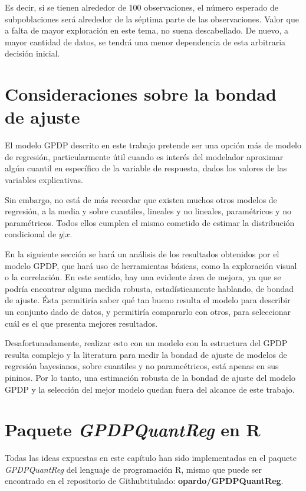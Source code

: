 Es decir, si se tienen alrededor de 100 observaciones, el n\'umero esperado de subpoblaciones ser\'a alrededor de la s\'eptima parte de las observaciones. Valor que a falta de mayor exploraci\'on en este tema, no suena descabellado. De nuevo, a mayor cantidad de datos, se tendr\'a una menor dependencia de esta arbitraria decisi\'on inicial.

\section{Consideraciones sobre la bondad de ajuste}

El modelo GPDP descrito en este trabajo pretende ser una opci\'on m\'as de modelo de regresi\'on, particularmente \'util cuando es inter\'es del modelador aproximar alg\'un cuantil en espec\'ifico de la variable de respuesta, dados los valores de las variables explicativas.

Sin embargo, no est\'a de m\'as recordar que existen muchos otros modelos de regresi\'on, a la media y sobre cuantiles, lineales y no lineales, param\'etricos y no param\'etricos. Todos ellos cumplen el mismo cometido de estimar la distribuci\'on condicional de $y|x$.

En la siguiente secci\'on se har\'a un an\'alisis de los resultados obtenidos por el modelo GPDP, que har\'a uso de herramientas b\'asicas, como la exploraci\'on visual o la correlaci\'on. En este sentido, hay una evidente \'area de mejora, ya que se podr\'ia encontrar alguna medida robusta, estad\'isticamente hablando, de bondad de ajuste. \'Esta permitir\'ia saber qu\'e tan bueno resulta el modelo para describir un conjunto dado de datos, y permitir\'ia compararlo con otros, para seleccionar cu\'al es el que presenta mejores resultados. 

Desafortunadamente, realizar esto con un modelo con la estructura del GPDP resulta complejo y la literatura para medir la bondad de ajuste de modelos de regresi\'on bayesianos, sobre cuantiles y no parame\'etricos, est\'a apenas en sus pininos. Por lo tanto, una estimaci\'on robusta de la bondad de ajuste del modelo GPDP y la selecci\'on del mejor modelo quedan fuera del alcance de este trabajo.


\section{Paquete \textit{GPDPQuantReg} en R}

Todas las ideas expuestas en este cap\'itulo han sido implementadas en el paquete \textit{GPDPQuantReg} del lenguaje de programaci\'on R, mismo que puede ser encontrado en el repositorio de Github\faGithub \space titulado: \textbf{opardo/GPDPQuantReg}.

